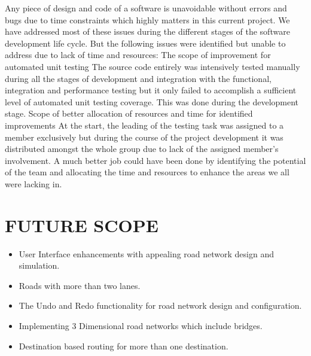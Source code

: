 \documentclass[11pt,a4paper]{article}
\begin{document}
Any piece of design and code of a software is unavoidable without errors and bugs due to time constraints which highly matters in this current project. We have addressed most of these issues during the different stages of the software development life cycle. But the following issues were identified but unable to address due to lack of time and resources:\newline
The scope of improvement for automated unit testing\newline
The source code entirely was intensively tested manually during all the stages of development and integration with the functional, integration and performance testing but it only failed to accomplish a sufficient level of automated unit testing coverage. This was done during the development stage.\newline
Scope of better allocation of resources and time for identified improvements\newline
At the start, the leading of the testing task was assigned to a member exclusively but during the course of the project development it was distributed amongst the whole group due to lack of the assigned member's involvement. A much better job could have been done by identifying the potential of the team and allocating the time and resources to enhance the areas we all were lacking in.

\section{FUTURE SCOPE}

\begin{itemize}
\item User Interface enhancements with appealing road network design and simulation. 
\item Roads with more than two lanes.
\item The Undo and Redo functionality for road network design and configuration. 
\item Implementing 3 Dimensional road networks which include bridges. 
\item Destination based routing for more than one destination. 
\end{itemize}
\end{document}
